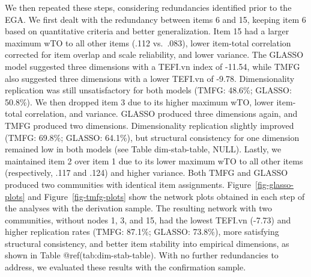 \documentclass[
  12pt,
  twoside,
  openright,
  a4paper,
  chapter=TITLE,
  section=TITLE,
  brazil]{abntex2}
\begin{document}
We then repeated these steps, considering redundancies identified prior
to the EGA. We first dealt with the redundancy between items 6 and 15,
keeping item 6 based on quantitative criteria and better generalization.
Item 15 had a larger maximum wTO to all other items (.112 vs.~.083),
lower item-total correlation corrected for item overlap and scale
reliability, and lower variance. The GLASSO model suggested three
dimensions with a TEFI.vn index of -11.54, while TMFG also suggested
three dimensions with a lower TEFI.vn of -9.78. Dimensionality
replication was still unsatisfactory for both models (TMFG: 48.6\%;
GLASSO: 50.8\%). We then dropped item 3 due to its higher maximum wTO,
lower item-total correlation, and variance. GLASSO produced three
dimensions again, and TMFG produced two dimensions. Dimensionality
replication slightly improved (TMFG: 69.8\%; GLASSO: 64.1\%), but
structural consistency for one dimension remained low in both models
(see Table dim-stab-table, NULL). Lastly, we maintained item 2 over item
1 due to its lower maximum wTO to all other items (respectively, .117
and .124) and higher variance. Both TMFG and GLASSO produced two
communities with identical item assignments.
Figure~\ref{fig-glasso-plots} and Figure~\ref{fig-tmfg-plots} show the
network plots obtained in each step of the analyses with the derivation
sample. The resulting network with two communities, without nodes 1, 3,
and 15, had the lowest TEFI.vn (-7.73) and higher replication rates
(TMFG: 87.1\%; GLASSO: 73.8\%), more satisfying structural consistency,
and better item stability into empirical dimensions, as shown in Table
@ref(tab:dim-stab-table). With no further redundancies to address, we
evaluated these results with the confirmation sample.
\end{document}
